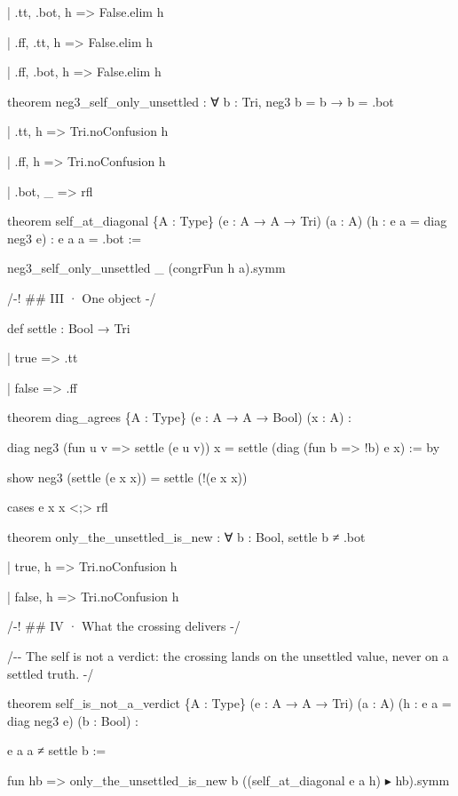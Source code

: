 \documentclass[10pt,twocolumn]{article}
\newenvironment{Shaded}{}{}
\newcommand{\NormalTok}[1]{#1}
\providecommand{\NormalTok}[1]{#1}
\providecommand{\NormalTok}[1]{#1}
\begin{document}
\begin{strip}
\begin{Shaded}
\begin{Highlighting}[]
\NormalTok{  | .tt, .bot, h =\textgreater{} False.elim h}

\NormalTok{  | .ff, .tt, h =\textgreater{} False.elim h}

\NormalTok{  | .ff, .bot, h =\textgreater{} False.elim h}

\NormalTok{theorem neg3\_self\_only\_unsettled : ∀ b : Tri, neg3 b = b → b = .bot}

\NormalTok{  | .tt, h =\textgreater{} Tri.noConfusion h}

\NormalTok{  | .ff, h =\textgreater{} Tri.noConfusion h}

\NormalTok{  | .bot, \_ =\textgreater{} rfl}

\NormalTok{theorem self\_at\_diagonal \{A : Type\} (e : A → A → Tri) (a : A) (h : e a = diag neg3 e) : e a a = .bot :=}

\NormalTok{  neg3\_self\_only\_unsettled \_ (congrFun h a).symm}

\NormalTok{/{-}! \#\# III · One object {-}/}

\NormalTok{def settle : Bool → Tri}

\NormalTok{  | true =\textgreater{} .tt}

\NormalTok{  | false =\textgreater{} .ff}

\NormalTok{theorem diag\_agrees \{A : Type\} (e : A → A → Bool) (x : A) :}

\NormalTok{    diag neg3 (fun u v =\textgreater{} settle (e u v)) x = settle (diag (fun b =\textgreater{} !b) e x) := by}

\NormalTok{  show neg3 (settle (e x x)) = settle (!(e x x))}

\NormalTok{  cases e x x \textless{};\textgreater{} rfl}

\NormalTok{theorem only\_the\_unsettled\_is\_new : ∀ b : Bool, settle b ≠ .bot}

\NormalTok{  | true, h =\textgreater{} Tri.noConfusion h}

\NormalTok{  | false, h =\textgreater{} Tri.noConfusion h}

\NormalTok{/{-}! \#\# IV · What the crossing delivers {-}/}

\NormalTok{/{-}{-} The self is not a verdict: the crossing lands on the unsettled value, never on a settled truth. {-}/}

\NormalTok{theorem self\_is\_not\_a\_verdict \{A : Type\} (e : A → A → Tri) (a : A) (h : e a = diag neg3 e) (b : Bool) :}

\NormalTok{    e a a ≠ settle b :=}

\NormalTok{  fun hb =\textgreater{} only\_the\_unsettled\_is\_new b ((self\_at\_diagonal e a h) ▸ hb).symm}


\end{Highlighting}
\end{Shaded}
\end{strip}
\end{document}
